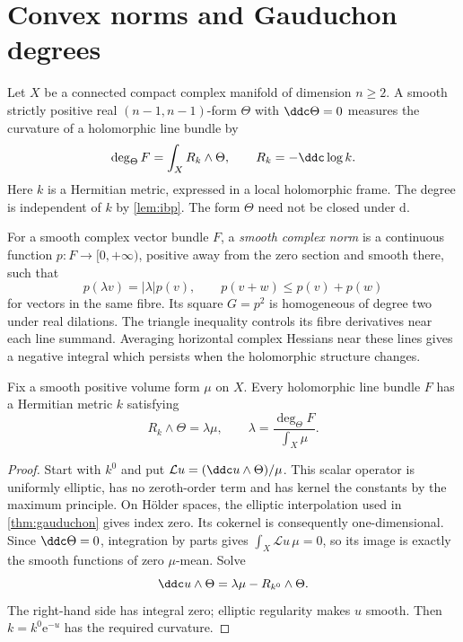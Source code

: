 \section{Convex norms and Gauduchon degrees}
\label{sec:convex-bundle-norm-obstruction}

Let $X$ be a connected compact complex manifold of dimension $n\geq2$. A smooth strictly positive real $(n-1,n-1)$-form $\Theta$ with $\ddc\Theta=0$ measures the curvature of a holomorphic line bundle by
\[
 \deg_\Theta F=\int_XR_k\wedge\Theta,
 \qquad R_k=-\ddc\log k.
\]
Here $k$ is a Hermitian metric, expressed in a local holomorphic frame. The degree is independent of $k$ by \cref{lem:ibp}. The form $\Theta$ need not be closed under $\mathrm d$.

For a smooth complex vector bundle $F$, a \emph{smooth complex norm} is a continuous function $p:F\to[0,+\infty)$, positive away from the zero section and smooth there, such that
\[
 p(\lambda v)=|\lambda|p(v),\qquad p(v+w)\leq p(v)+p(w)
\]
for vectors in the same fibre. Its square $G=p^2$ is homogeneous of degree two under real dilations. The triangle inequality controls its fibre derivatives near each line summand. Averaging horizontal complex Hessians near these lines gives a negative integral which persists when the holomorphic structure changes.

\begin{lemma}\label{lem:bundle-degree-normalization}
Fix a smooth positive volume form $\mu$ on $X$. Every holomorphic line bundle $F$ has a Hermitian metric $k$ satisfying
\[
 R_k\wedge\Theta=\lambda\mu,
 \qquad \lambda=\frac{\deg_\Theta F}{\int_X\mu}.
\]
\end{lemma}
\begin{proof}
Start with $k^0$ and put $\mathcal Lu=(\ddc u\wedge\Theta)/\mu$. This scalar operator is uniformly elliptic, has no zeroth-order term and has kernel the constants by the maximum principle. On H\"older spaces, the elliptic interpolation used in \cref{thm:gauduchon} gives index zero. Its cokernel is consequently one-dimensional. Since $\ddc\Theta=0$, integration by parts gives $\int_X\mathcal Lu\,\mu=0$, so its image is exactly the smooth functions of zero $\mu$-mean. Solve
\[
 \ddc u\wedge\Theta=\lambda\mu-R_{k^0}\wedge\Theta.
\]
The right-hand side has integral zero; elliptic regularity makes $u$ smooth. Then $k=k^0\mathrm e^{-u}$ has the required curvature.
\end{proof}


